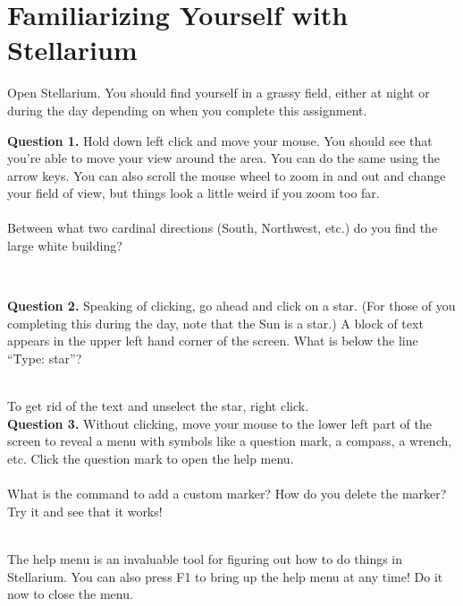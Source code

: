 \documentclass[11pt]{article}
\begin{document}
\newpage

\section{Familiarizing Yourself with Stellarium}

Open Stellarium. You should find yourself in a grassy field, either at night or during the day depending on when you complete this assignment.

\noindent
\textbf{Question 1.} Hold down left click and move your mouse. You should see that you're able to move your view around the area. You can do the same using the arrow keys. You can also scroll the mouse wheel to zoom in and out and change your field of view, but things look a little weird if you zoom too far.\\
\\
Between what two cardinal directions (South, Northwest, etc.) do you find the large white building?\\
\vspace*{1.5cm}

\hrulefill\\
\noindent

\textbf{Question 2.} Speaking of clicking, go ahead and click on a star. (For those of you completing this during the day, note that the Sun is a star.) A block of text appears in the upper left hand corner of the screen. What is below the line ``Type: star''?\\
\vspace*{1.5cm}


\hrulefill\\
To get rid of the text and unselect the star, right click.\\

\textbf{Question 3.} Without clicking, move your mouse to the lower left part of the screen to reveal a menu with symbols like a question mark, a compass, a wrench, etc. Click the question mark to open the help menu.\\
\\
What is the command to add a custom marker? How do you delete the marker? Try it and see that it works!\\
\vspace*{1.5cm}

\hrulefill\\

The help menu is an invaluable tool for figuring out how to do things in Stellarium. You can also press F1 to bring up the help menu at any time! Do it now to close the menu.
\end{document}

